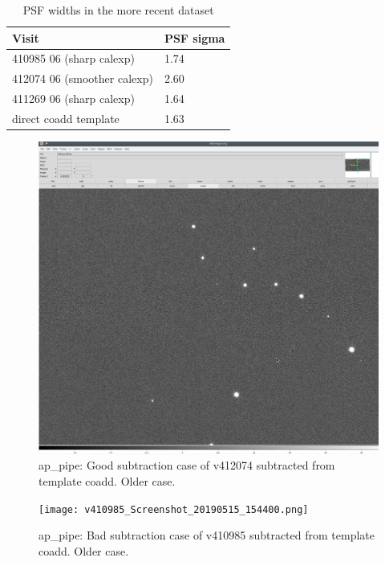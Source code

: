 \documentclass{article}
\begin{document}
%
\begin{table}[h]
  \begin{center}
  \begin{tabular}{ll}
    \hline
    Visit & PSF sigma \\
    \hline
    410985 06 (sharp calexp) & 1.74 \\
    412074 06 (smoother calexp) & 2.60 \\
    411269 06 (sharp calexp) & 1.64 \\
    direct coadd template & 1.63 \\
    \hline
  \end{tabular}
  \end{center}
    \caption{\label{tab:psfs}PSF widths in the more recent dataset}
\end{table}

\begin{figure}
  \includegraphics[width=\textwidth]{v412074_Screenshot_20190515_160748.png}
  \caption{ap\_pipe: Good subtraction case of v412074 subtracted from
    template coadd. Older case.}
\end{figure}
%
\begin{figure}
  \texttt{[image: v410985\_Screenshot\_20190515\_154400.png]}
\caption{\label{fig:v410985old}ap\_pipe: Bad subtraction case of v410985 subtracted from
  template coadd. Older case.}  
\end{figure}
%
\end{document}
